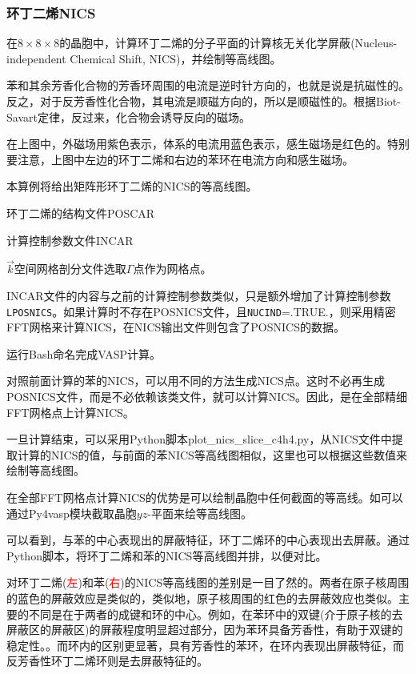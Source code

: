 \subsubsection{环丁二烯\rm{NICS}}
在$8\times8\times8$的晶胞中，计算环丁二烯的分子平面的计算核无关化学屏蔽\textrm{(Nucleus-independent Chemical Shift, NICS)}，并绘制等高线图。

苯和其余芳香化合物的芳香环周围的电流是逆时针方向的，也就是说是抗磁性的。反之，对于反芳香性化合物，其电流是顺磁方向的，所以是顺磁性的。根据\textrm{Biot-Savart}定律，反过来，化合物会诱导反向的磁场。

在上图中，外磁场用紫色表示，体系的电流用蓝色表示，感生磁场是红色的。特别要注意，上图中左边的环丁二烯和右边的苯环在电流方向和感生磁场。

本算例将给出矩阵形环丁二烯的\textrm{NICS}的等高线图。

环丁二烯的结构文件\textrm{POSCAR}

计算控制参数文件\textrm{INCAR}

$\vec k$空间网格剖分文件选取$\Gamma$点作为网格点。

\textrm{INCAR}文件的内容与之前的计算控制参数类似，只是额外增加了计算控制参数\texttt{LPOSNICS}。如果计算时不存在\textrm{POSNICS}文件，且\texttt{NUCIND}=\textrm{.TRUE.}，则采用精密\textrm{FFT}网格来计算\textrm{NICS}，在\textrm{NICS}输出文件则包含了\textrm{POSNICS}的数据。

运行\textrm{Bash}命名完成\textrm{VASP}计算。

对照前面计算的苯的\textrm{NICS}，可以用不同的方法生成\textrm{NICS}点。这时不必再生成\textrm{POSNICS}文件，而是不必依赖该类文件，就可以计算\textrm{NICS}。因此，是在全部精细\textrm{FFT}网格点上计算\textrm{NICS}。

一旦计算结束，可以采用\textrm{Python}脚本\textrm{plot\_nics_slice\_c4h4.py}，从\textrm{NICS}文件中提取计算的\textrm{NICS}的值，与前面的苯\textrm{NICS}等高线图相似，这里也可以根据这些数值来绘制等高线图。

在全部\textrm{FFT}网格点计算\textrm{NICS}的优势是可以绘制晶胞中任何截面的等高线。如可以通过\textrm{Py4vasp}模块截取晶胞$yz$-平面来绘等高线图。

可以看到，与苯的中心表现出的屏蔽特征，环丁二烯环的中心表现出去屏蔽。通过\textrm{Python}脚本，将环丁二烯和苯的\textrm{NICS}等高线图并排，以便对比。

对环丁二烯(\textcolor{red}{左})和苯(\textcolor{red}{右})的\textrm{NICS}等高线图的差别是一目了然的。两者在原子核周围的蓝色的屏蔽效应是类似的，类似地，原子核周围的红色的去屏蔽效应也类似。主要的不同是在于两者的成键和环的中心。例如，在苯环中的双键(介于原子核的去屏蔽区的屏蔽区)的屏蔽程度明显超过部分，因为苯环具备芳香性，有助于双键的稳定性。。而环内的区别更显著，具有芳香性的苯环，在环内表现出屏蔽特征，而反芳香性环丁二烯环则是去屏蔽特征的。


